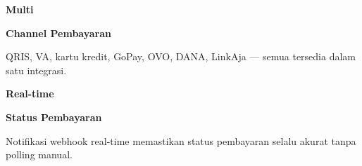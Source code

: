 \documentclass[a4paper]{article}
\begin{document}
\begin{minipage}[t]{0.485\textwidth}
    \noindent\colorbox{BlueBg}{%
        \begin{minipage}[t][2.7cm][c]{\dimexpr\linewidth-2\fboxsep\relax}
            \centering
            {\fontsize{20}{24}\selectfont\bfseries\color{GreenPrimary} Multi}\par\vspace{2pt}
            {\fontsize{9.5}{12}\selectfont\bfseries\color{BlueDark} Channel Pembayaran}\par\vspace{2pt}
            {\fontsize{8.5}{11}\selectfont\color{TextDark}QRIS, VA, kartu kredit, GoPay, OVO, DANA, LinkAja --- semua tersedia dalam satu integrasi.}
        \end{minipage}}\par
    \vspace{6pt}
    \noindent\colorbox{BlueBg}{%
        \begin{minipage}[t][2.7cm][c]{\dimexpr\linewidth-2\fboxsep\relax}
            \centering
            {\fontsize{20}{24}\selectfont\bfseries\color{GreenPrimary} Real-time}\par\vspace{2pt}
            {\fontsize{9.5}{12}\selectfont\bfseries\color{BlueDark} Status Pembayaran}\par\vspace{2pt}
            {\fontsize{8.5}{11}\selectfont\color{TextDark}Notifikasi webhook real-time memastikan status pembayaran selalu akurat tanpa polling manual.}
        \end{minipage}}%
\end{minipage}

\vspace{8pt}
\end{document}
